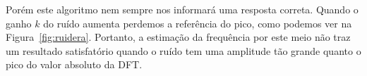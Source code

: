 \documentclass{homeworkclass}
\begin{document}
\begin{homeworkProblem}
	Porém este algoritmo nem sempre nos informará uma resposta correta. Quando o ganho $k$ do ruído aumenta perdemos a referência do pico, como podemos ver na Figura~\ref{fig:ruidera}. Portanto, a estimação da frequência por este meio não traz um resultado satisfatório quando o ruído tem uma amplitude tão grande quanto o pico do valor absoluto da DFT.
	
	\begin{figure}[!h]
		\centering
		~
		\\
		~
		

\end{figure}
\end{homeworkProblem}
\end{document}
